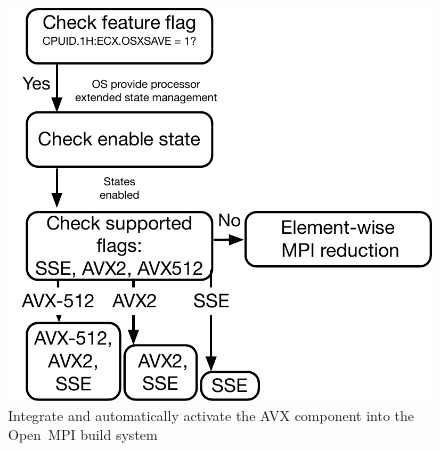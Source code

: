 \documentclass[5p,times,twocolumn]{elsarticle}
\newcommand{\ompi}[0]{Open~MPI\xspace}
\begin{document}
\begin{figure}[h]
    \centering
    \includegraphics[scale=.45]{avx-graph.pdf}
    \caption{Integrate and automatically activate the AVX component into the \ompi build system}
    \label{fig:512flow}
\end{figure}

\end{document}
